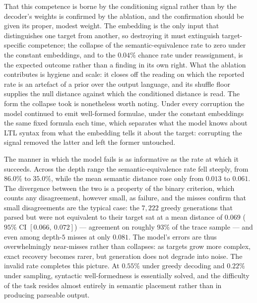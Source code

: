 \documentclass[titlepage,a4paper,11pt]{report}
\begin{document}
    That this competence is borne by the conditioning signal rather than by the decoder's weights is confirmed by the ablation, and the confirmation should be given its proper, modest weight. The embedding is the only input that distinguishes one target from another, so destroying it must extinguish target-specific competence; the collapse of the semantic-equivalence rate to zero under the constant embeddings, and to the $0.04\%$ chance rate under reassignment, is the expected outcome rather than a finding in its own right. What the ablation contributes is hygiene and scale: it closes off the reading on which the reported rate is an artefact of a prior over the output language, and its shuffle floor supplies the null distance against which the conditioned distance is read. The form the collapse took is nonetheless worth noting. Under every corruption the model continued to emit well-formed formulae, under the constant embeddings the same fixed formula each time, which separates what the model knows about LTL syntax from what the embedding tells it about the target: corrupting the signal removed the latter and left the former untouched.
    
    The manner in which the model fails is as informative as the rate at which it succeeds. Across the depth range the semantic-equivalence rate fell steeply, from $86.0\%$ to $35.0\%$, while the mean semantic distance rose only from $0.013$ to $0.061$. The divergence between the two is a property of the binary criterion, which counts any disagreement, however small, as failure, and the misses confirm that small disagreements are the typical case: the $7{,}222$ greedy generations that parsed but were not equivalent to their target sat at a mean distance of $0.069$ ($95\%$ CI $[0.066,\ 0.072]$) --- agreement on roughly $93\%$ of the trace sample --- and even among depth-$5$ misses at only $0.081$. The model's errors are thus overwhelmingly near-misses rather than collapses: as targets grow more complex, exact recovery becomes rarer, but generation does not degrade into noise. The invalid rate completes this picture. At $0.55\%$ under greedy decoding and $0.22\%$ under sampling, syntactic well-formedness is essentially solved, and the difficulty of the task resides almost entirely in semantic placement rather than in producing parseable output.
    
\end{document}
